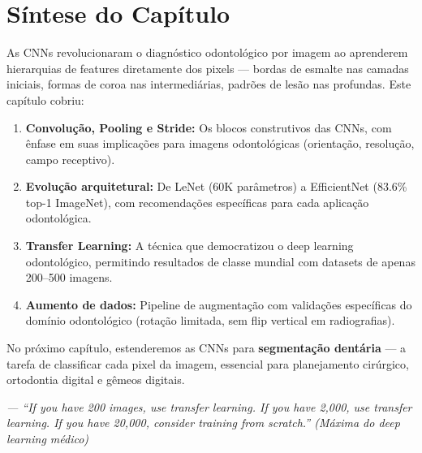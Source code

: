 

\section{Síntese do Capítulo}
\label{sec:sintese-07}

As CNNs revolucionaram o diagnóstico odontológico por imagem ao aprenderem
hierarquias de features diretamente dos pixels --- bordas de esmalte nas
camadas iniciais, formas de coroa nas intermediárias, padrões de lesão nas
profundas. Este capítulo cobriu:

\begin{enumerate}
  \item \textbf{Convolução, Pooling e Stride:} Os blocos construtivos das CNNs,
        com ênfase em suas implicações para imagens odontológicas (orientação,
        resolução, campo receptivo).
  \item \textbf{Evolução arquitetural:} De LeNet (60K parâmetros) a EfficientNet
        (83.6\% top-1 ImageNet), com recomendações específicas para cada
        aplicação odontológica.
  \item \textbf{Transfer Learning:} A técnica que democratizou o deep learning
        odontológico, permitindo resultados de classe mundial com datasets de
        apenas 200--500 imagens.
  \item \textbf{Aumento de dados:} Pipeline de augmentação com validações
        específicas do domínio odontológico (rotação limitada, sem flip vertical
        em radiografias).
\end{enumerate}

No próximo capítulo, estenderemos as CNNs para \textbf{segmentação dentária}
--- a tarefa de classificar cada pixel da imagem, essencial para planejamento
cirúrgico, ortodontia digital e gêmeos digitais.

\begin{flushright}
\itshape\small
--- ``If you have 200 images, use transfer learning. If you have 2,000, use
transfer learning. If you have 20,000, consider training from scratch.''
(Máxima do deep learning médico)
\end{flushright}

